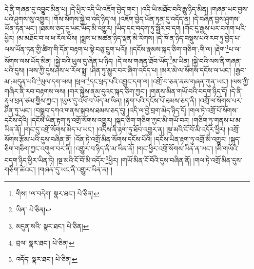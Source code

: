 དེ་ནི་གཞན་དུ་འབྱུང་མིན་པ། །དེ་ཕྱིར་འདི་ཡི་འཇོག་བྱེད་གང་། །འདི་ཡི་མཐོང་བའི་རྒྱུ་ཉིད་མིན། །གཞན་ཡང་བྱས་པའི་ཤུགས་སུ་འགྱུར། །གོས་སོགས་སྐྱེ་བ་འདི་ཉིད་ལ། །འཇོག་བྱེད་ཡོན་ཏན་དུ་འདོད་ན། །དེ་བཞིན་བྱས་ཤུགས་ཡོན་ཏན་ཡང་། །ཐམས་ཅད་དུ་ཡང་ཡོད་མི་འགྱུར། །ཡིད་དང་བདག་ཏུ་སྦྱོར་བ་དག །གོང་དུ་རྒྱས་པར་བཀག་པའི་ཕྱིར། །མ་མཐོང་བ་ལ་ཕ་རོལ་པོས། །སྨྲས་པ་མཚན་ཉིད་ལྡན་མི་རིགས། །དེ་ཁོ་ན་ཉིད་བསྡུས་པའི་རབ་ཏུ་བྱེད་པ་ལས་ཡོན་ཏན་གྱི་ཚིག་གི་དོན་བརྟག་པ་སྟེ་བཅུ་དྲུག་པའོ།། །།དངོས་རྣམས་སྐད་ཅིག་གཅིག་:གི་ལ། །རྡེག་\footnote{གིས། །ལ་བདེག་  སྣར་ཐང་།  པེ་ཅིན། }པ་ལ་སོགས་ལས་ཡོད་མིན། །སྐྱེ་བའི་ཡུལ་དུ་ཞེན་པ་ཉིད། །དེ་ལས་གཞན་ཐོབ་ཡོད་\footnote{ཡིན་  པེ་ཅིན། }མ་ཡིན། །སྐྱེ་བའི་ལས་ནི་གཞན་པའི་དུས། །ལས་ཀྱི་དུས་ཤེས་ཕ་རོལ་སྨྲ། །ཤིན་ཏུ་མྱུར་བར་ཞིག་འདོད་པ། །མར་མེ་ལ་སོགས་དངོས་ལ་ཡང་། །རྒྱབ་མ་:མདུན་པའི་\footnote{མདུན་སའི་  སྣར་ཐང་།  པེ་ཅིན། }ཡུལ་དག་ལས། །ཕྲལ་\footnote{བྲལ་  སྣར་ཐང་།  པེ་ཅིན། }དང་ཕྲད་པའི་འབྱུང་དག་ལ། །འགྲོ་བ་ཅན་ནམ་གཞན་ཀུན་ཡང་། །ལས་ཀྱི་གཞིར་ནི་རབ་བརྟགས་ལས། །གར་སྐྱེས་ནམ་དུའང་སྐད་ཅིག་ཀྱང་། །གནས་མིན་གཡོ་བའི་བདག་ཉིད་དོ། །དེ་ནི་རྡུལ་ཕྲན་ཙམ་གྱིས་ཀྱང་། །ཡུལ་དུ་འཕོ་བ་ཡོད་མ་ཡིན། །རྟག་པའི་དངོས་པོ་ཐམས་ཅད་ནི། །འགྲོ་ལ་སོགས་པར་ཤིན་ཏུ་ཡང་། །བསྒྲུབ་དཀའ་གནས་སྐབས་ཐམས་ཅད་དུ། །འདི་ལ་བྱེ་བྲག་མེད་ཉིད་དོ། །གལ་ཏེ་འགྲོ་པོ་སོགས་དངོས་དེའི། །དངོས་ཡིན་རྟག་ཏུ་འགྲོ་སོགས་འགྱུར། །སྐད་ཅིག་གཅིག་ཀྱང་མི་གཡོ་བར། །གཅིག་ཏུ་གནས་པ་མ་ཡིན་ནོ། །གང་དུ་འགྲོ་སོགས་མེད་པ་ཡང་། །འདིས་ནི་རྟག་ཏུ་ཐོབ་འགྱུར་ན། །སྔ་མའི་ངོ་བོ་མི་འདོར་ཕྱིར། །འགྲོ་སོགས་རྩོམ་པའི་དུས་བཞིན་ནོ། །འོན་ཏེ་འགྲོ་མིན་སོགས་དངོས་པོའི། །དངོས་ཡིན་རྟག་ཏུ་འགྲོ་མི་འགྱུར། །སྐད་ཅིག་གཅིག་ཀྱང་འགུལ་བར་ནི། །འགྱུར་བ་ཉིད་ནི་མ་ཡིན་ནོ། །གང་ཕྱིར་འགྲོ་སོགས་ཡིན་ན་ཡང་། །མི་གཡོའི་བདག་ཉིད་ཕྱིར་ཡིན་ཏེ། །སྔ་མའི་ངོ་བོ་མི་འདོར་\footnote{འདོད་  སྣར་ཐང་།  པེ་ཅིན། }ཕྱིར། །གཡོ་མིན་ངོ་བོའི་དུས་བཞིན་ནོ། །གལ་ཏེ་འགྲོ་མིན་དུས་གཅིག་ཚེའང་། །གཞན་དུ་ཡང་ནི་འགྱུར་ཡིན་ན། །
